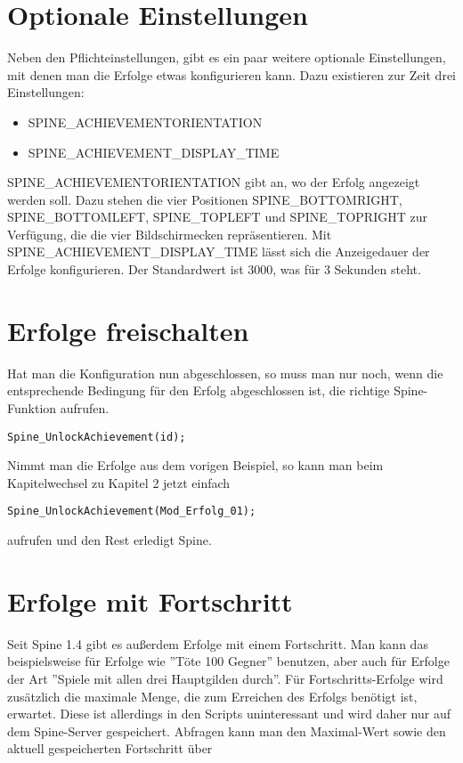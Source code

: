 \documentclass{article}
\begin{document}
\section{Optionale Einstellungen}

Neben den Pflichteinstellungen, gibt es ein paar weitere optionale Einstellungen, mit denen man die Erfolge etwas konfigurieren kann. Dazu existieren zur Zeit drei Einstellungen:

\begin{itemize}
	\item SPINE\_ACHIEVEMENTORIENTATION
	\item SPINE\_ACHIEVEMENT\_DISPLAY\_TIME
\end{itemize}

SPINE\_ACHIEVEMENTORIENTATION gibt an, wo der Erfolg angezeigt werden soll. Dazu stehen die vier Positionen SPINE\_BOTTOMRIGHT, SPINE\_BOTTOMLEFT, SPINE\_TOPLEFT und SPINE\_TOPRIGHT zur Verfügung, die die vier Bildschirmecken repräsentieren. Mit SPINE\_ACHIEVEMENT\_DISPLAY\_TIME lässt sich die Anzeigedauer der Erfolge konfigurieren. Der Standardwert ist 3000, was für 3 Sekunden steht.

\section{Erfolge freischalten}

Hat man die Konfiguration nun abgeschlossen, so muss man nur noch, wenn die entsprechende Bedingung für den Erfolg abgeschlossen ist, die richtige Spine-Funktion aufrufen.

\begin{lstlisting}
Spine_UnlockAchievement(id);
\end{lstlisting}

Nimmt man die Erfolge aus dem vorigen Beispiel, so kann man beim Kapitelwechsel zu Kapitel 2 jetzt einfach

\begin{lstlisting}
Spine_UnlockAchievement(Mod_Erfolg_01);
\end{lstlisting}

aufrufen und den Rest erledigt Spine.

\section{Erfolge mit Fortschritt}

Seit Spine 1.4 gibt es außerdem Erfolge mit einem Fortschritt. Man kann das beispielsweise für Erfolge wie ''Töte 100 Gegner'' benutzen, aber auch für Erfolge der Art ''Spiele mit allen drei Hauptgilden durch''. Für Fortschritts-Erfolge wird zusätzlich die maximale Menge, die zum Erreichen des Erfolgs benötigt ist, erwartet. Diese ist allerdings in den Scripts uninteressant und wird daher nur auf dem Spine-Server gespeichert. Abfragen kann man den Maximal-Wert sowie den aktuell gespeicherten Fortschritt über
\end{document}
